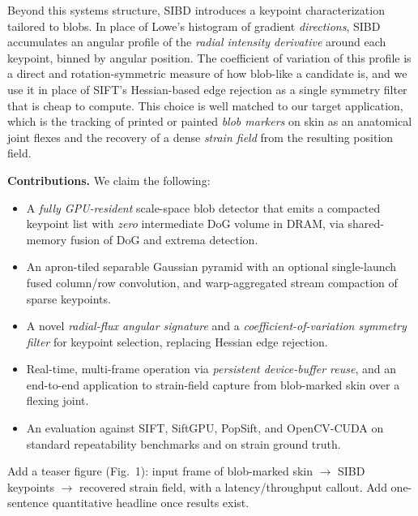 Beyond this systems structure, SIBD introduces a keypoint characterization
tailored to blobs. In place of Lowe's histogram of gradient \emph{directions},
SIBD accumulates an angular profile of the \emph{radial intensity derivative}
around each keypoint, binned by angular position. The coefficient of variation
of this profile is a direct and rotation-symmetric measure of how blob-like a
candidate is, and we use it in place of SIFT's Hessian-based edge rejection as a
single symmetry filter that is cheap to compute. This choice is well matched to
our target application, which is the tracking of printed or painted \emph{blob
markers} on skin as an anatomical joint flexes and the recovery of a dense
\emph{strain field} from the resulting position field.

\vspace{0.5em}
\noindent\textbf{Contributions.} We claim the following:
\begin{itemize}
  \item A \emph{fully GPU-resident} scale-space blob detector that emits a
        compacted keypoint list with \emph{zero} intermediate DoG volume in
        DRAM, via shared-memory fusion of DoG and extrema detection.
  \item An apron-tiled separable Gaussian pyramid with an optional
        single-launch fused column/row convolution, and warp-aggregated stream
        compaction of sparse keypoints.
  \item A novel \emph{radial-flux angular signature} and a
        \emph{coefficient-of-variation symmetry filter} for keypoint selection,
        replacing Hessian edge rejection.
  \item Real-time, multi-frame operation via \emph{persistent device-buffer
        reuse}, and an end-to-end application to strain-field capture from
        blob-marked skin over a flexing joint.
  \item An evaluation against SIFT, SiftGPU, PopSift, and OpenCV-CUDA on
        standard repeatability benchmarks and on strain ground truth.
\end{itemize}

\begin{fillbox}
Add a teaser figure (Fig.~1): input frame of blob-marked skin $\rightarrow$
SIBD keypoints $\rightarrow$ recovered strain field, with a latency/throughput
callout. Add one-sentence quantitative headline once results exist.
\end{fillbox}

